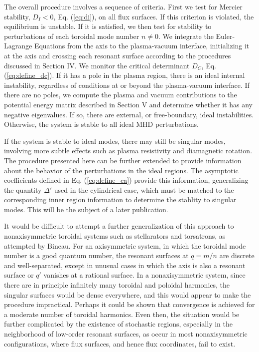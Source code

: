 \documentclass[prb,twocolumn,showpacs,preprintnumbers,amsmath,amssymb]{revtex4}
\begin{document}
The overall procedure involves a sequence of criteria.  First we test
for Mercier stability, $D_I < 0$, Eq. (\ref{eq:di}), on all flux
surfaces.  If this criterion is violated, the equilibrium is unstable.
If it is satisfied, we then test for stability to perturbations of each
toroidal mode number $n \ne 0$.  We integrate the Euler-Lagrange
Equations from the axis to the plasma-vacuum interface, initializing it
at the axis and crossing each resonant surface according to the
procedures discussed in Section IV.  We monitor the critical determinant
$D_C$, Eq. (\ref{eq:define_dc}).  If it has a pole in the plasma region,
there is an ideal internal instability, regardless of conditions at or
beyond the plasma-vacuum interface.  If there are no poles, we compute
the plasma and vacuum contributions to the potential energy matrix
described in Section V and determine whether it has any negative
eigenvalues.  If so, there are external, or free-boundary, ideal
instabilities.  Otherwise, the system is stable to all ideal MHD
perturbations.

If the system is stable to ideal modes, there may still be singular
modes, involving more subtle effects such as plasma resistivity and
diamagnetic rotation.\cite{ahg75, ahg91} The procedure presented here
can be further extended to provide information about the behavior of the
perturbations in the ideal regions.  The asymptotic coefficients defined
in Eq. (\ref{eq:define_ca}) provide this information, generalizing the
quantity $\Delta'$ used in the cylindrical case, which must be matched
to the corresponding inner region information to determine the stablity
to singular modes.  This will be the subject of a later publication.

It would be difficult to attempt a further generalization of this
approach to nonaxisymmetric toroidal systems such as stellarators and
torsatrons, as attempted by Bineau.\cite{mb61} For an axisymmetric
system, in which the toroidal mode number is a good quantum number, the
resonant surfaces at $q=m/n$ are discrete and well-separated, except in
unusual cases in which the axis is also a resonant surface or $q'$
vanishes at a rational surface.  In a nonaxisymmetric system, since
there are in principle infinitely many toroidal and poloidal harmonics,
the singular surfaces would be dense everywhere, and this would appear
to make the procedure impractical.  Perhaps it could be shown that
convergence is achieved for a moderate number of toroidal harmonics.
Even then, the situation would be further complicated by the existence
of stochastic regions, especially in the neighborhood of low-order
resonant surfaces, as occur in most nonaxisymmetric configurations,
where flux surfaces, and hence flux coordinates, fail to exist.
\end{document}
